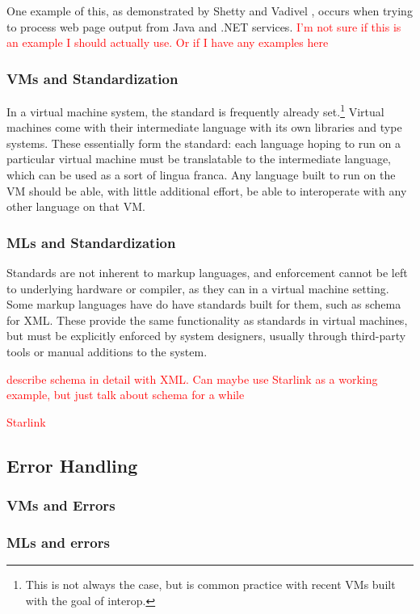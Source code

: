 \documentclass{sig-alternate}
\newcommand{\mycomment}[1]{\textcolor{red}{#1}}
\begin{document}
One example of this, as demonstrated by Shetty and Vadivel \cite{Shetty:2009}, occurs when trying to process web page output from Java and .NET services. \mycomment{I'm not sure if this is an example I should actually use. Or if I have any examples here}

\subsubsection*{VMs and Standardization}
In a virtual machine system, the standard is frequently already set.\footnote{This is not always the case, but is common practice with recent VMs built with the goal of interop.} Virtual machines come with their intermediate language with its own libraries and type systems. These essentially form the standard: each language hoping to run on a particular virtual machine must be translatable to the intermediate language, which can be used as a sort of lingua franca. Any language built to run on the VM should be able, with little additional effort, be able to interoperate with any other language on that VM.


\subsubsection*{MLs and Standardization}
Standards are not inherent to markup languages, and enforcement cannot be left to underlying hardware or compiler, as they can in a virtual machine setting. Some markup languages have do have standards built for them, such as schema for XML. These provide the same functionality as standards in virtual machines, but must be explicitly enforced by system designers, usually through third-party tools or manual additions to the system.

\mycomment{describe schema in detail with XML. Can maybe use Starlink as a working example, but just talk about schema for a while}
	
\mycomment{Starlink}



\subsection{Error Handling}\label{errors}

\subsubsection*{VMs and Errors}

\subsubsection*{MLs and errors}
\end{document}
